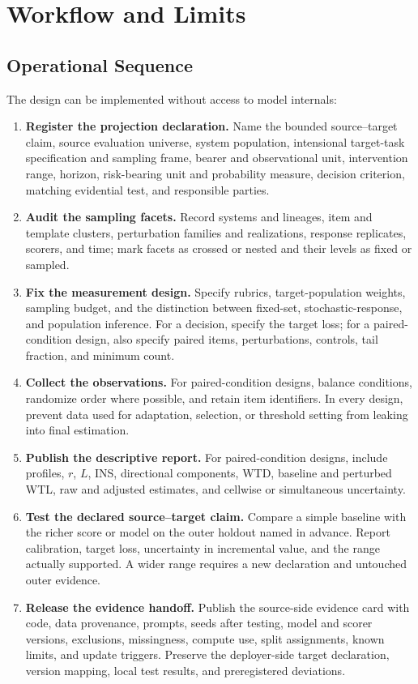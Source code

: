 \documentclass[12pt]{article}
\begin{document}
\section{Workflow and Limits}\label{sec:workflow}

\subsection{Operational Sequence}\label{ssec:workflow_sequence}

The design can be implemented without access to model internals:

\begin{enumerate}
\item \textbf{Register the projection declaration.} Name the bounded source--target claim, source evaluation universe, system population, intensional target-task specification and sampling frame, bearer and observational unit, intervention range, horizon, risk-bearing unit and probability measure, decision criterion, matching evidential test, and responsible parties.
\item \textbf{Audit the sampling facets.} Record systems and lineages, item and template clusters, perturbation families and realizations, response replicates, scorers, and time; mark facets as crossed or nested and their levels as fixed or sampled.
\item \textbf{Fix the measurement design.} Specify rubrics, target-population weights, sampling budget, and the distinction between fixed-set, stochastic-response, and population inference. For a decision, specify the target loss; for a paired-condition design, also specify paired items, perturbations, controls, tail fraction, and minimum count.
\item \textbf{Collect the observations.} For paired-condition designs, balance conditions, randomize order where possible, and retain item identifiers. In every design, prevent data used for adaptation, selection, or threshold setting from leaking into final estimation.
\item \textbf{Publish the descriptive report.} For paired-condition designs, include profiles, \(r\), \(L\), INS, directional components, WTD, baseline and perturbed WTL, raw and adjusted estimates, and cellwise or simultaneous uncertainty.
\item \textbf{Test the declared source--target claim.} Compare a simple baseline with the richer score or model on the outer holdout named in advance. Report calibration, target loss, uncertainty in incremental value, and the range actually supported. A wider range requires a new declaration and untouched outer evidence.
\item \textbf{Release the evidence handoff.} Publish the source-side evidence card with code, data provenance, prompts, seeds after testing, model and scorer versions, exclusions, missingness, compute use, split assignments, known limits, and update triggers. Preserve the deployer-side target declaration, version mapping, local test results, and preregistered deviations.
\end{enumerate}
\end{document}
